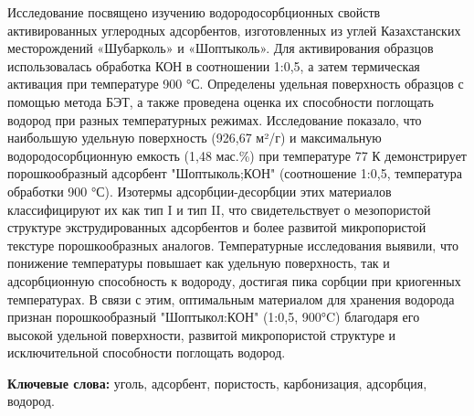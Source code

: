 Исследование посвящено изучению водородосорбционных свойств
активированных углеродных адсорбентов, изготовленных из углей
Казахстанских месторождений «Шубарколь» и «Шоптыколь». Для активирования
образцов использовалась обработка КОН в соотношении 1:0,5, а затем
термическая активация при температуре 900 °С. Определены удельная
поверхность образцов с помощью метода БЭТ, а также проведена оценка их
способности поглощать водород при разных температурных режимах.
Исследование показало, что наибольшую удельную поверхность (926,67 м²/г)
и максимальную водородосорбционную емкость (1,48 мас.\%) при температуре
77 К демонстрирует порошкообразный адсорбент "Шоптыколь;КОН"
(соотношение 1:0,5, температура обработки 900 °С). Изотермы
адсорбции-десорбции этих материалов классифицируют их как тип I и тип
II, что свидетельствует о мезопористой структуре экструдированных
адсорбентов и более развитой микропористой текстуре порошкообразных
аналогов. Температурные исследования выявили, что понижение температуры
повышает как удельную поверхность, так и адсорбционную способность к
водороду, достигая пика сорбции при криогенных температурах. В связи с
этим, оптимальным материалом для хранения водорода признан
порошкообразный "Шоптыкол:КОН" (1:0,5, 900°C) благодаря его высокой
удельной поверхности, развитой микропористой структуре и исключительной
способности поглощать водород.

{\bfseries Ключевые слова:} уголь, адсорбент, пористость, карбонизация,
адсорбция, водород.

